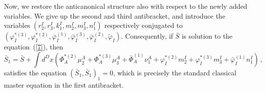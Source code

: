 \documentclass[a4paper,10pt]{article}
\begin{document}
Now, we restore the anticanonical structure also with respect to the newly
added variables. We give up the second and third antibracket, and introduce
the variables $\left(
r_{2}^{I},r_{3}^{I},k_{1}^{I},m_{2}^{I},m_{3}^{I},n_{1}^{I}\right) $
respectively conjugated to $\left( \varphi _{I}^{*(3)},\varphi _{I}^{*(2)},%
\bar{\varphi}_{I}^{(1)},\bar{\varphi}_{I}^{(3)},\bar{\varphi}_{I}^{(2)},%
\tilde{\varphi}_{I}\right) $. Consequently, if $\bar{S}$ is solution to the
equation~(\ref{7}), then 
\begin{equation}
\label{23}
\bar{S}_{1}=\bar{S}+\int d^{D}x\left( \Phi _{A}^{*(2)}\mu _{2}^{A}+\Phi
_{A}^{*(3)}\mu _{3}^{A}+\bar{\Phi}_{A}^{(1)}\nu _{1}^{A}+\varphi
_{I}^{*(2)}m_{2}^{I}+\varphi _{I}^{*(3)}m_{3}^{I}+\bar{\varphi}%
_{I}^{(1)}n_{1}^{I}\right) \,,
\end{equation}
satisfies the equation $\left( \bar{S}_{1},\bar{S}_{1}\right) _{1}=0$, which
is precisely the standard classical master equation in the first antibracket.
\end{document}
